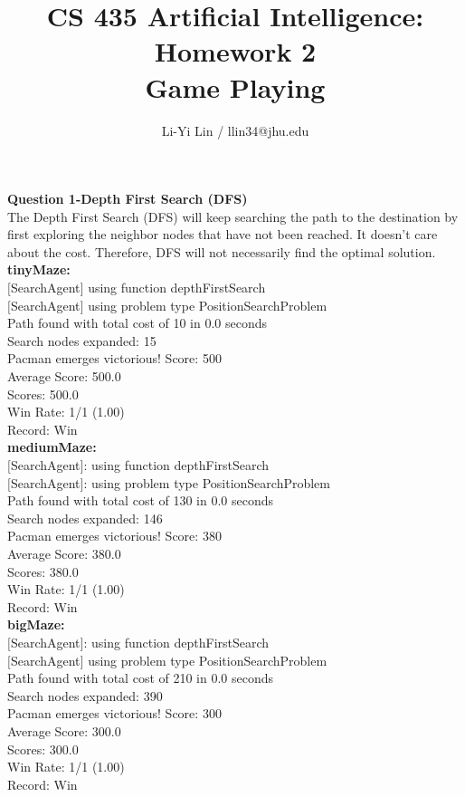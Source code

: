 \documentclass[11pt]{article}
\title{CS 435 Artificial Intelligence: Homework 2\\Game Playing\\}
\author{Li-Yi Lin / llin34@jhu.edu}
\begin{document}
\maketitle
\noindent
\textbf{Question 1-Depth First Search (DFS)}\\
The Depth First Search (DFS) will keep searching the path to the destination by first exploring the neighbor nodes that have not been reached. It doesn't care about the cost. Therefore, DFS will not necessarily find the optimal solution. \\

\noindent
\textbf{tinyMaze: }\\
$[$SearchAgent$]$ using function depthFirstSearch\\
$[$SearchAgent$]$ using problem type PositionSearchProblem\\
Path found with total cost of 10 in 0.0 seconds\\
Search nodes expanded: 15\\
Pacman emerges victorious! Score: 500\\
Average Score: 500.0\\
Scores:        500.0\\
Win Rate:      1/1 (1.00)\\
Record:        Win\\

\noindent
\textbf{mediumMaze:}\\
$[$SearchAgent$]$: using function depthFirstSearch\\
$[$SearchAgent$]$: using problem type PositionSearchProblem\\
Path found with total cost of 130 in 0.0 seconds\\
Search nodes expanded: 146\\
Pacman emerges victorious! Score: 380\\
Average Score: 380.0\\
Scores:        380.0\\
Win Rate:      1/1 (1.00)\\
Record:        Win\\

\noindent
\textbf{bigMaze:}\\
$[$SearchAgent$]$: using function depthFirstSearch\\
$[$SearchAgent$]$ using problem type PositionSearchProblem\\
Path found with total cost of 210 in 0.0 seconds\\
Search nodes expanded: 390\\
Pacman emerges victorious! Score: 300\\
Average Score: 300.0\\
Scores:        300.0\\
Win Rate:      1/1 (1.00)\\
Record:        Win\\
\end{document}
